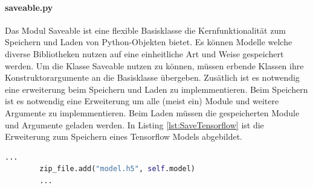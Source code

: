 	 \paragraph{saveable.py} Das Modul Saveable ist eine flexible Basisklasse die Kernfunktionalität zum Speichern und Laden von Python-Objekten bietet. Es können Modelle welche diverse Bibliotheken nutzen auf eine einheitliche Art und Weise gespeichert werden. Um die Klasse Saveable nutzen zu können, müssen erbende Klassen ihre Konstruktorargumente an die Basisklasse übergeben. Zusätlich ist es notwendig eine erweiterung beim Speichern und Laden zu implemmentieren. Beim Speichern ist es notwendig eine Erweiterung um alle (meist ein) Module und weitere Argumente zu implemmentieren. Beim Laden müssen die gespeicherten Module und Argumente geladen werden. In Listing \ref{lst:SaveTensorflow} ist die Erweiterung zum Speichern eines Tensorflow Models abgebildet. 
	\begin{lstlisting}[language=python,caption=Erweiterung zum Speichern eines Tensorflow Models, label=lst:SaveTensorflow]
		...
		zip_file.add("model.h5", self.model)
		...
	\end{lstlisting}

